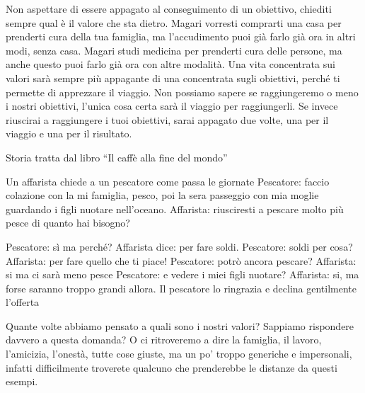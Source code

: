 \documentclass[12pt]{book} %
\begin{document}
Non aspettare di essere appagato al conseguimento di un obiettivo, chiediti sempre qual è il valore
che sta dietro. Magari vorresti comprarti una casa per prenderti cura della tua famiglia, ma l'accudimento puoi già farlo già ora in altri modi, senza casa.
Magari studi medicina per prenderti cura delle persone, ma anche questo puoi farlo già ora con altre modalità. Una vita
concentrata sui valori sarà sempre più appagante di una concentrata sugli obiettivi, perché ti permette di apprezzare
il viaggio. Non possiamo sapere se raggiungeremo o meno i nostri obiettivi, l'unica cosa certa
sarà il viaggio per raggiungerli. Se invece riuscirai a raggiungere i tuoi obiettivi, sarai appagato due volte, una per
il viaggio e una per il risultato.

\begin{mdframed}[linewidth=1pt]
Storia tratta dal libro “Il caffè alla fine del
mondo”

Un affarista chiede a un pescatore come passa le giornate\newline
Pescatore: faccio colazione con la mi famiglia, pesco, poi la sera passeggio con mia moglie guardando i figli nuotare
nell'oceano.\newline
Affarista: riusciresti a pescare molto più pesce di quanto hai bisogno?

Pescatore: sì ma perché? \newline
Affarista dice: per fare soldi. \newline
Pescatore: soldi per cosa? \newline
Affarista: per fare quello che ti piace! \newline
Pescatore: potrò ancora pescare?\newline
Affarista: si ma ci sarà meno pesce\newline
Pescatore: e vedere i miei figli nuotare?\newline
Affarista: si, ma forse saranno troppo grandi allora.\newline
Il pescatore lo ringrazia e declina gentilmente l'offerta 
\end{mdframed}

\bigskip

Quante volte abbiamo pensato a quali sono i nostri valori?
Sappiamo rispondere davvero a questa domanda? O ci ritroveremo a dire la famiglia, il lavoro,
l'amicizia, l'onestà, tutte cose giuste, ma un po' troppo generiche e impersonali, infatti difficilmente troverete qualcuno che prenderebbe le distanze da questi esempi.
\end{document}
